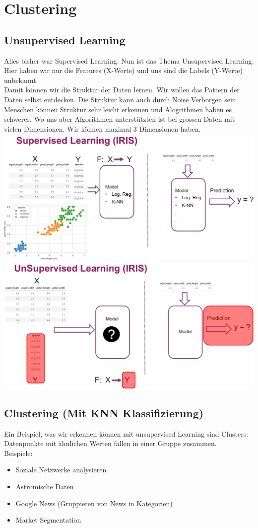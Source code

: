 \section{Clustering}
\subsection{Unsupervised Learning}
Alles bisher war Supervised Learning. Nun ist das Thema Unsupervised Learning. Hier haben wir nur die Features (X-Werte) und uns sind die Labels (Y-Werte) unbekannt.\\
Damit können wir die Struktur der Daten lernen. Wir wollen das Pattern der Daten selbst entdecken. Die Struktur kann auch durch Noise Verborgen sein. Menschen können Struktur sehr leicht erkennen und Alogrithmen haben es schwerer. Wo uns aber Algorithmen unterstützten ist bei grossen Daten mit vielen Dimensionen. Wir können maximal 3 Dimensionen haben.
\includegraphics[width=\linewidth]{img/supervised_iris.png}
\includegraphics[width=\linewidth]{img/unsupervised_iris.png}
\subsection{Clustering (Mit KNN Klassifizierung)}
Ein Beispiel, was wir erkennen können mit unsupervised Learning sind Clusters: Datenpunkte mit ähnlichen Werten fallen in einer Gruppe zusammen.\\
\textcolor{myblue}{Beispiele:}
\begin{itemize}
\item Soziale Netzwerke analysieren
\item Astromische Daten
\item Google News (Gruppieren von News in Kategorien)
\item Market Segmentation
\end{itemize}

